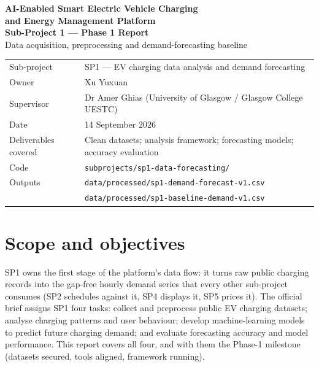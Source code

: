 \documentclass[11pt,a4paper]{article}
\newcommand{\code}[1]{\texttt{\small #1}}
\begin{document}
\begin{center}
  {\LARGE\bfseries AI-Enabled Smart Electric Vehicle Charging\\[2pt]
   and Energy Management Platform}\\[8pt]
  {\large\bfseries Sub-Project 1 — Phase 1 Report}\\[4pt]
  {\large Data acquisition, preprocessing and demand-forecasting baseline}
\end{center}

\begin{table}[H]
\centering
\begin{tabular}{@{}ll@{}}
\toprule
Sub-project & SP1 — EV charging data analysis and demand forecasting \\
Owner      & Xu Yuxuan \\
Supervisor & Dr Amer Ghias (University of Glasgow / Glasgow College UESTC) \\
Date       & 14 September 2026 \\
\midrule
Deliverables covered & Clean datasets; analysis framework; forecasting models; accuracy evaluation \\
Code        & \code{subprojects/sp1-data-forecasting/} \\
Outputs     & \code{data/processed/sp1-demand-forecast-v1.csv} \\
            & \code{data/processed/sp1-baseline-demand-v1.csv} \\
\bottomrule
\end{tabular}
\end{table}

\section{Scope and objectives}

SP1 owns the first stage of the platform's data flow: it turns raw public charging
records into the gap-free hourly demand series that every other sub-project consumes
(SP2 schedules against it, SP4 displays it, SP5 prices it). The official brief assigns
SP1 four tasks: collect and preprocess public EV charging datasets; analyse charging
patterns and user behaviour; develop machine-learning models to predict future charging
demand; and evaluate forecasting accuracy and model performance. This report covers all
four, and with them the Phase-1 milestone (datasets secured, tools aligned, framework
running).
\end{document}
